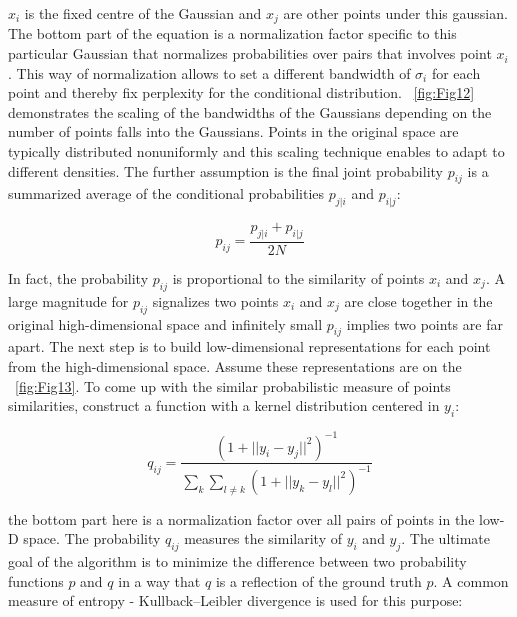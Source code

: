 $x_i$ is the fixed centre of the Gaussian and $x_j$ are other points under this gaussian. The bottom part of the equation is a normalization factor specific to this particular Gaussian that normalizes probabilities over pairs that involves point $x_i$. This way of normalization allows to set a different bandwidth of $\sigma_i$ for each point and thereby fix perplexity for the conditional distribution. ~\autoref{fig:Fig12} demonstrates the scaling of the bandwidths of the Gaussians depending on the number of points falls into the Gaussians. Points in the original space are typically distributed nonuniformly and this scaling technique enables to adapt to different densities.
The further assumption is the final joint probability $p_{ij}$ is a summarized average of the conditional probabilities $p_{j|i}$ and $p_{i|j}$:

\begin{equation}
  p_{ij}=\frac{p_{j|i} + p_{i|j}}{2N}
    \label{eq:equat9}
\end{equation}

In fact, the probability $p_{ij}$ is proportional to the similarity of points $x_i$ and $x_j$. A large magnitude for $p_{ij}$ signalizes two points $x_i$ and $x_j$ are close together in the original high-dimensional space and infinitely small $p_{ij}$ implies two points are far apart.
The next step is to build low-dimensional representations for each point from the high-dimensional space. Assume these representations are on the ~\autoref{fig:Fig13}. To come up with the similar probabilistic measure of points similarities, construct a function with a kernel distribution centered in $y_i$:

\begin{equation}
  q_{ij}=\frac{(1+||y_i-y_j||^2)^{-1}}{\sum_{k}\sum_{l\neq k}(1+||y_k-y_l||^2)^{-1}}
    \label{eq:equat10}
\end{equation}

the bottom part here is a normalization factor over all pairs of points in the low-D space. The probability $q_{ij}$ measures the similarity of $y_i$ and $y_j$. 
The ultimate goal of the algorithm is to minimize the difference between two probability functions $p$ and $q$ in a way that $q$ is a reflection of the ground truth $p$. A common measure of entropy - Kullback–Leibler divergence is used for this purpose:

